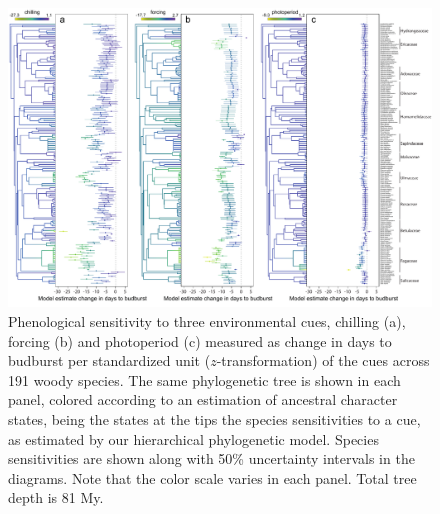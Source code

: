 \documentclass[11pt]{article}
\begin{document}
\begin{figure} 
  \begin{center}
  \includegraphics[width=16cm]{../../analyses/phylogeny/figures/Fig1_phylo_muplots191_clades.pdf}
  \caption{Phenological sensitivity to three environmental cues, chilling (a), forcing (b) and photoperiod (c) measured as change in days to budburst per standardized unit ($z$-transformation) of the cues across 191 woody species. The same phylogenetic tree is shown in each panel, colored according to an estimation of ancestral character states, being the states at the tips the species sensitivities to a cue, as estimated by our hierarchical phylogenetic model. Species sensitivities are shown along with 50\% uncertainty intervals in the diagrams. Note that the color scale varies in each panel. Total tree depth is 81 My.}
  \label{fig:muplot_all}
  \end{center}
\end{figure}

\clearpage
\end{document}
